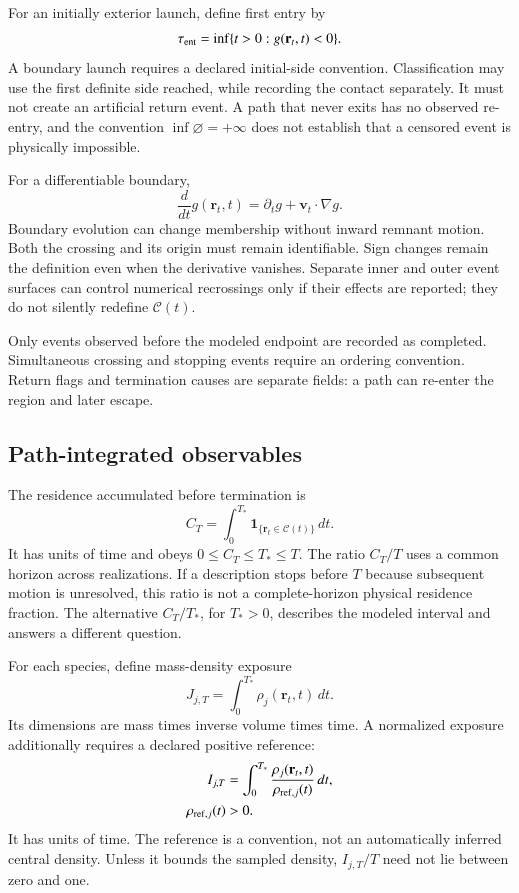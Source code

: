 \documentclass[aps,prd,reprint,amsmath,amssymb,superscriptaddress,nofootinbib,longbibliography,floatfix]{revtex4-2}
\begin{document}
For an initially exterior launch, define first entry by
\begin{equation}
\tau_{\rm ent}=\inf\{t>0:g(\mathbf r_t,t)<0\}.
\label{eq:entry}
\end{equation}
A boundary launch requires a declared initial-side convention. Classification may use the first definite side reached, while recording the contact separately. It must not create an artificial return event. A path that never exits has no observed re-entry, and the convention $\inf\varnothing=+\infty$ does not establish that a censored event is physically impossible.

For a differentiable boundary,
\begin{equation}
\frac{d}{dt}g(\mathbf r_t,t)
=\partial_t g+\mathbf v_t\cdot\nabla g.
\label{eq:moving-boundary}
\end{equation}
Boundary evolution can change membership without inward remnant motion. Both the crossing and its origin must remain identifiable. Sign changes remain the definition even when the derivative vanishes. Separate inner and outer event surfaces can control numerical recrossings only if their effects are reported; they do not silently redefine $\mathcal C(t)$.

Only events observed before the modeled endpoint are recorded as completed. Simultaneous crossing and stopping events require an ordering convention. Return flags and termination causes are separate fields: a path can re-enter the region and later escape.

\subsection{Path-integrated observables}

The residence accumulated before termination is
\begin{equation}
C_T=\int_0^{T_*}
\mathbf{1}_{\{\mathbf r_t\in\mathcal C(t)\}}\,dt.
\label{eq:residence}
\end{equation}
It has units of time and obeys $0\le C_T\le T_*\le T$. The ratio $C_T/T$ uses a common horizon across realizations. If a description stops before $T$ because subsequent motion is unresolved, this ratio is not a complete-horizon physical residence fraction. The alternative $C_T/T_*$, for $T_*>0$, describes the modeled interval and answers a different question.

For each species, define mass-density exposure
\begin{equation}
J_{j,T}=\int_0^{T_*}\rho_j(\mathbf r_t,t)\,dt.
\label{eq:physical-exposure}
\end{equation}
Its dimensions are mass times inverse volume times time. A normalized exposure additionally requires a declared positive reference:
\begin{align}
I_{j,T}&=\int_0^{T_*}
\frac{\rho_j(\mathbf r_t,t)}{\rho_{{\rm ref},j}(t)}\,dt,
\label{eq:normalized-exposure}\\
\rho_{{\rm ref},j}(t)&>0.\nonumber
\end{align}
It has units of time. The reference is a convention, not an automatically inferred central density. Unless it bounds the sampled density, $I_{j,T}/T$ need not lie between zero and one.
\end{document}
